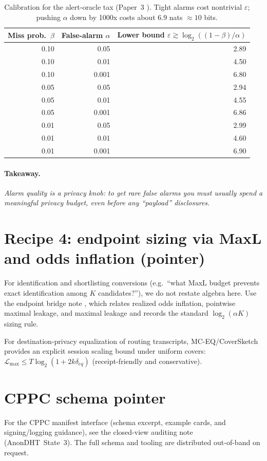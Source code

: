 \documentclass[11pt]{article}
\newcommand{\takeaway}[1]{\paragraph{Takeaway.}\emph{#1}}
\begin{document}
\begin{table}[h]
\centering
\begin{tabular}{@{}rrr@{}}
\toprule
Miss prob.\ $\beta$ & False-alarm $\alpha$ & Lower bound $\varepsilon \gtrsim \log_2((1-\beta)/\alpha)$ \\
\midrule
0.10 & 0.05  & 2.89 \\
0.10 & 0.01  & 4.50 \\
0.10 & 0.001 & 6.80 \\
0.05 & 0.05  & 2.94 \\
0.05 & 0.01  & 4.55 \\
0.05 & 0.001 & 6.86 \\
0.01 & 0.05  & 2.99 \\
0.01 & 0.01  & 4.60 \\
0.01 & 0.001 & 6.90 \\
\bottomrule
\end{tabular}
\caption{Calibration for the alert-oracle tax (Paper~3 \cite{state3}). Tight alarms cost nontrivial $\varepsilon$; pushing $\alpha$ down by 1000x costs about 6.9 nats $\approx 10$ bits.}
\label{tab:alert-tax-calibration}
\end{table}

\takeaway{Alarm quality is a privacy knob: to get rare false alarms you must usually spend a meaningful privacy budget, even before any ``payload'' disclosures.}

\section{Recipe 4: endpoint sizing via MaxL and odds inflation (pointer)}
For identification and shortlisting conversions (e.g.\ ``what MaxL budget prevents exact identification among $K$ candidates?''), we do not restate algebra here.
Use the endpoint bridge note \cite{synth5}, which relates realized odds inflation, pointwise maximal leakage, and maximal leakage and records the standard $\log_2(\alpha K)$ sizing rule.

For destination-privacy equalization of routing transcripts, MC-EQ/CoverSketch provides an explicit session scaling bound under uniform covers: $\mathcal{L}_{\max}\le T\log_2(1+2k\delta_{eq})$ (receipt-friendly and conservative).\cite{series:mceq}

\section{CPPC schema pointer}
For the CPPC manifest interface (schema excerpt, example cards, and signing/logging guidance), see the closed-view auditing note (AnonDHT~State~3).\cite{state3} The full schema and tooling are distributed out-of-band on request.\cite{series:artifactpolicy}
\end{document}
